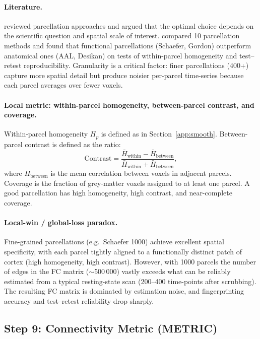 \documentclass[11pt,a4paper]{article}
\begin{document}
\paragraph{Literature.}
\citet{eickhoff2018} reviewed parcellation approaches and argued that the optimal choice depends on the scientific question and spatial scale of interest.  \citet{arslan2018} compared 10 parcellation methods and found that functional parcellations (Schaefer, Gordon) outperform anatomical ones (AAL, Desikan) on tests of within-parcel homogeneity and test--retest reproducibility.  Granularity is a critical factor: finer parcellations (400+) capture more spatial detail but produce noisier per-parcel time-series because each parcel averages over fewer voxels.

\paragraph{Local metric: within-parcel homogeneity, between-parcel contrast, and coverage.}
Within-parcel homogeneity $H_p$ is defined as in Section~\ref{app:smooth}.  Between-parcel contrast is defined as the ratio:
\begin{equation}
    \mathrm{Contrast} = \frac{\bar{H}_{\mathrm{within}} - \bar{H}_{\mathrm{between}}}{\bar{H}_{\mathrm{within}} + \bar{H}_{\mathrm{between}}},
\end{equation}
where $\bar{H}_{\mathrm{between}}$ is the mean correlation between voxels in adjacent parcels.  Coverage is the fraction of grey-matter voxels assigned to at least one parcel.  A good parcellation has high homogeneity, high contrast, and near-complete coverage.

\paragraph{Local-win / global-loss paradox.}
Fine-grained parcellations (e.g.\ Schaefer 1000) achieve excellent spatial specificity, with each parcel tightly aligned to a functionally distinct patch of cortex (high homogeneity, high contrast).  However, with 1000 parcels the number of edges in the FC matrix ($\sim$500\,000) vastly exceeds what can be reliably estimated from a typical resting-state scan (200--400 time-points after scrubbing).  The resulting FC matrix is dominated by estimation noise, and fingerprinting accuracy and test--retest reliability drop sharply.

\subsection{Step 9: Connectivity Metric (METRIC)}
\label{app:metric}
\end{document}
